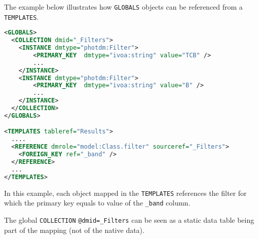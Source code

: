 The example below illustrates how \texttt{GLOBALS} objects can be referenced from a  \texttt{TEMPLATES}. 

\begin{lstlisting}[caption={Dynamic reference example.},language=XML]
<GLOBALS>
  <COLLECTION dmid="_Filters">
    <INSTANCE dmtype="photdm:Filter">
		<PRIMARY_KEY  dmtype="ivoa:string" value="TCB" />
		...
	</INSTANCE>
	<INSTANCE dmtype="photdm:Filter">
		<PRIMARY_KEY  dmtype="ivoa:string" value="B" />
		...
	</INSTANCE>
  </COLLECTION>
</GLOBALS>

<TEMPLATES tableref="Results">
  ....
  <REFERENCE dmrole="model:Class.filter" sourceref="_Filters">
    <FOREIGN_KEY ref="_band" />
  </REFERENCE>
  ...
</TEMPLATES>

\end{lstlisting}  

In this example, each object mapped in the \texttt{TEMPLATES} references the filter for which the primary key equals to value of the \texttt{\_band} column.

The global \texttt{COLLECTION} \texttt{@dmid=\_Filters} can be seen as a static data table being part of the mapping (not of the native data).

